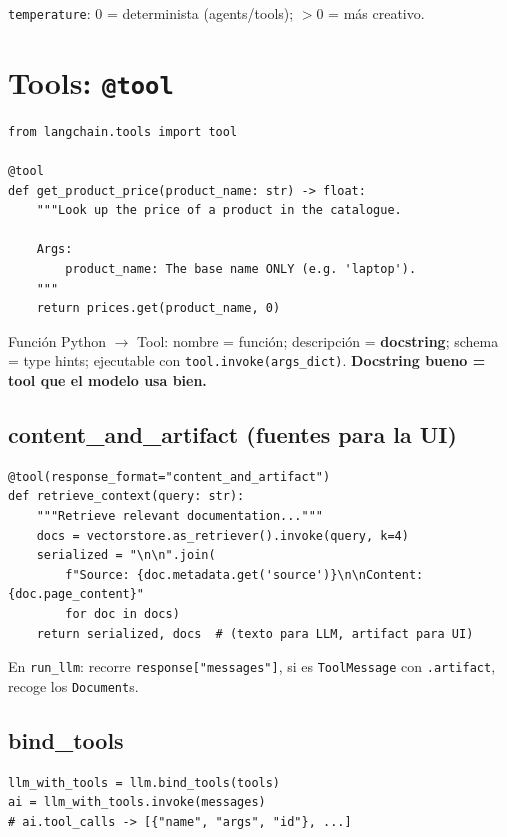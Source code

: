 \documentclass[11pt,a4paper]{article}
\begin{document}
\texttt{temperature}: 0 = determinista (agents/tools); $>$0 = más creativo.

\section{Tools: \texttt{@tool}}

\begin{lstlisting}
from langchain.tools import tool

@tool
def get_product_price(product_name: str) -> float:
    """Look up the price of a product in the catalogue.

    Args:
        product_name: The base name ONLY (e.g. 'laptop').
    """
    return prices.get(product_name, 0)
\end{lstlisting}

\begin{concept}[title=Qué hace @tool]
Función Python $\to$ Tool: nombre = función; descripción = \textbf{docstring};
schema = type hints; ejecutable con \texttt{tool.invoke(args\_dict)}.
\textbf{Docstring bueno = tool que el modelo usa bien.}
\end{concept}

\subsection{content\_and\_artifact (fuentes para la UI)}
\begin{lstlisting}
@tool(response_format="content_and_artifact")
def retrieve_context(query: str):
    """Retrieve relevant documentation..."""
    docs = vectorstore.as_retriever().invoke(query, k=4)
    serialized = "\n\n".join(
        f"Source: {doc.metadata.get('source')}\n\nContent: {doc.page_content}"
        for doc in docs)
    return serialized, docs  # (texto para LLM, artifact para UI)
\end{lstlisting}

En \texttt{run\_llm}: recorre \texttt{response["messages"]}, si es \texttt{ToolMessage} con \texttt{.artifact}, recoge los \texttt{Document}s.

\subsection{bind\_tools}
\begin{lstlisting}
llm_with_tools = llm.bind_tools(tools)
ai = llm_with_tools.invoke(messages)
# ai.tool_calls -> [{"name", "args", "id"}, ...]
\end{lstlisting}
\end{document}
